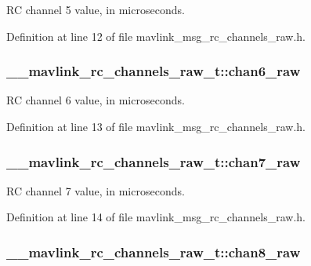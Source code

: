 R\-C channel 5 value, in microseconds. 



Definition at line 12 of file mavlink\-\_\-msg\-\_\-rc\-\_\-channels\-\_\-raw.\-h.

\hypertarget{struct____mavlink__rc__channels__raw__t_a4f2114cbf6637d9b0c661f08d54c9958}{
\subsubsection[{chan6\-\_\-raw}]{ \-\_\-\-\_\-mavlink\-\_\-rc\-\_\-channels\-\_\-raw\-\_\-t\-::chan6\-\_\-raw}}\label{struct____mavlink__rc__channels__raw__t_a4f2114cbf6637d9b0c661f08d54c9958}


R\-C channel 6 value, in microseconds. 



Definition at line 13 of file mavlink\-\_\-msg\-\_\-rc\-\_\-channels\-\_\-raw.\-h.

\hypertarget{struct____mavlink__rc__channels__raw__t_a6cccd33a0b2b888a3671e66e0c88d799}{
\subsubsection[{chan7\-\_\-raw}]{ \-\_\-\-\_\-mavlink\-\_\-rc\-\_\-channels\-\_\-raw\-\_\-t\-::chan7\-\_\-raw}}\label{struct____mavlink__rc__channels__raw__t_a6cccd33a0b2b888a3671e66e0c88d799}


R\-C channel 7 value, in microseconds. 



Definition at line 14 of file mavlink\-\_\-msg\-\_\-rc\-\_\-channels\-\_\-raw.\-h.

\hypertarget{struct____mavlink__rc__channels__raw__t_ac4181e5b2c297dbe24431a4ca1d1493e}{
\subsubsection[{chan8\-\_\-raw}]{ \-\_\-\-\_\-mavlink\-\_\-rc\-\_\-channels\-\_\-raw\-\_\-t\-::chan8\-\_\-raw}}\label{struct____mavlink__rc__channels__raw__t_ac4181e5b2c297dbe24431a4ca1d1493e}


